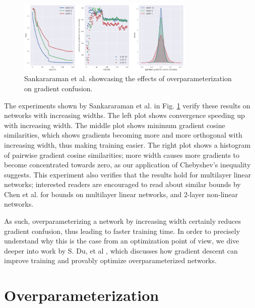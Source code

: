 \documentclass{article}
\begin{document}
\begin{figure}[h]
	\centering
    \includegraphics[width=0.75\textwidth]{pics/overparameterization/grad_consine_sim.png}
	\caption{Sankararaman et al. \cite{gradient_confusion} showcasing the effects of overparameterization on gradient confusion.}
	\label{fig:grad_cosine_sim}
\end{figure}

The experiments shown by Sankararaman et al. \cite{gradient_confusion} in Fig. \ref{fig:grad_cosine_sim} verify these results on networks with increasing widths. The left plot shows convergence speeding up with increasing width. The middle plot shows minimum gradient cosine similarities, which shows gradients becoming more and more orthogonal with increasing width, thus making training easier. The right plot shows a histogram of pairwise gradient cosine similarities; more width causes more gradients to become concentrated towards zero, as our application of Chebyshev's inequality suggests. This experiment also verifies that the results hold for multilayer linear networks; interested readers are encouraged to read about similar bounds by Chen et al. \cite{chen} for bounds on multilayer linear networks, and 2-layer non-linear networks.

As such, overparameterizing a network by increasing width certainly reduces gradient confusion, thus leading to faster training time. In order to precisely understand why this is the case from an optimization point of view, we dive deeper into work by S. Du, et al \cite{SimonDu}, which discusses how gradient descent can improve training and provably optimize overparameterized networks.

\section{Overparameterization}
\end{document}

